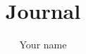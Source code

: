 \documentclass[11pt]{article}
\title{Journal}
\author{Your name}
\date{}
\begin{document}
\titleblock
\tableofcontents
\end{document}
